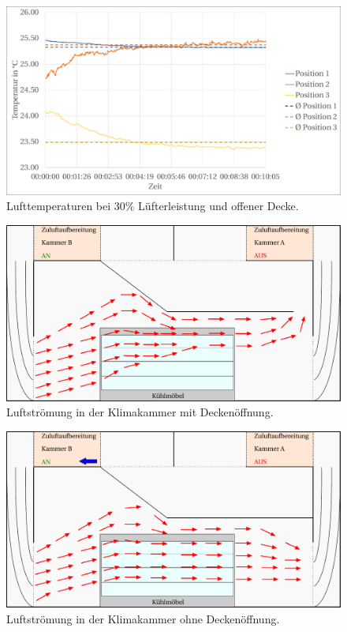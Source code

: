 \begin{figure}[h!tb]
\centering
\includegraphics[scale=.45]{Pictures/30pctOC_temp.pdf}
\caption{Lufttemperaturen bei 30\% Lüfterleistung und offener Decke.}
\label{fig:30pctOC_temp}
\end{figure}

\begin{figure}[h!tb]
\centering
\includegraphics[scale=.6]{Pictures/ClimateChamber_flow30pctOC.pdf}
\caption{Luftströmung in der Klimakammer mit Deckenöffnung.}
\label{fig:Klimakammer_offeneDecke}
\end{figure}

\begin{figure}[h!tb]
\centering
\includegraphics[scale=.6]{Pictures/ClimateChamber_flow30pctCC.pdf}
\caption{Luftströmung in der Klimakammer ohne Deckenöffnung.}
\label{fig:Klimakammer_geschlosseneDecke}
\end{figure}





